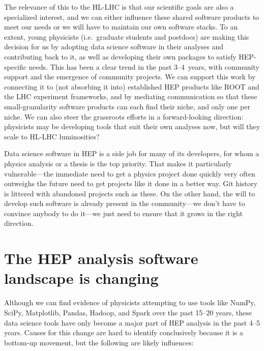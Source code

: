 \documentclass{article}
\begin{document}
The relevance of this to the HL-LHC is that our scientific goals are also a specialized interest, and we can either influence these shared software products to meet our needs or we will have to maintain our own software stacks. To an extent, young physicists (i.e.\ graduate students and postdocs) are making this decision for us by adopting data science software in their analyses and contributing back to it, as well as developing their own packages to satisfy HEP-specific needs. This has been a clear trend in the past 3--4~years, with community support and the emergence of community projects. We can support this work by connecting it to (not absorbing it into) established HEP products like ROOT and the LHC experiment frameworks, and by mediating communication so that these small-granularity software products can each find their niche, and only one per niche. We can also steer the grassroots efforts in a forward-looking direction: physicists may be developing tools that suit their own analyses now, but will they scale to HL-LHC luminosities?

Data science software in HEP is a side job for many of its developers, for whom a physics analysis or a thesis is the top priority. That makes it particularly vulnerable---the immediate need to get a physics project done quickly very often outweighs the future need to get projects like it done in a better way. Git history is littered with abandoned projects such as these. On the other hand, the will to develop such software is already present in the community---we don't have to convince anybody to do it---we just need to ensure that it grows in the right direction.

\section{The HEP analysis software landscape is changing}

Although we can find evidence of physicists attempting to use tools like NumPy, SciPy, Matplotlib, Pandas, Hadoop, and Spark over the past 15--20 years, these data science tools have only become a major part of HEP analysis in the past 4--5 years. Causes for this change are hard to identify conclusively because it is a bottom-up movement, but the following are likely influences:
\end{document}
